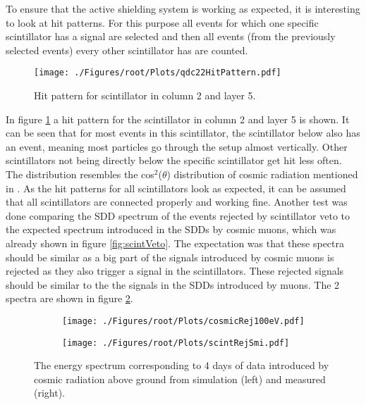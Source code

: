 To ensure that the active shielding system is working as expected, it is interesting to look at hit patterns. For this purpose all events for which one specific scintillator has a signal are selected and then all events (from the previously selected events) every other scintillator has are counted. 
\begin{figure}[h]
 \centering
 \texttt{[image: ./Figures/root/Plots/qdc22HitPattern.pdf]}
 \caption{Hit pattern for scintillator in column 2 and layer 5.}
 \label{fig:qdcCounts2}
\end{figure}
In figure \ref{fig:qdcCounts2} a hit pattern for the scintillator in column 2 and layer 5 is shown. It can be seen that for most events in this scintillator, the scintillator below also has an event, meaning most particles go through the setup almost vertically. Other scintillators not being directly below the specific scintillator get hit less often. The distribution resembles the cos$^{2}$($\theta$) distribution of cosmic radiation mentioned in \cite{Gaisser2000}. As the hit patterns for all scintillators look as expected, it can be assumed that all scintillators are connected properly and working fine.
Another test was done comparing the SDD spectrum of the events rejected by scintillator veto to the expected spectrum introduced in the SDDs by cosmic muons, which was already shown in figure \ref{fig:scintVeto}. The expectation was that these spectra should be similar as a big part of the signals introduced by cosmic muons is rejected as they also trigger a signal in the scintillators. These rejected signals should be similar to the the signals in the SDDs introduced by muons. The 2 spectra are shown in figure \ref{fig:scintRejSmi}.
\begin{figure}[h]
 \centering
 \begin{subfigure}{.49\textwidth}
 \centering
 \texttt{[image: ./Figures/root/Plots/cosmicRej100eV.pdf]}
 \end{subfigure}
 \hfill
 \begin{subfigure}{.49\textwidth}
 \centering
 \texttt{[image: ./Figures/root/Plots/scintRejSmi.pdf]}
 \end{subfigure}
 \caption{The energy spectrum corresponding to 4 days of data introduced by cosmic radiation above ground from simulation (left) and measured (right).}
 \label{fig:scintRejSmi}
\end{figure}
